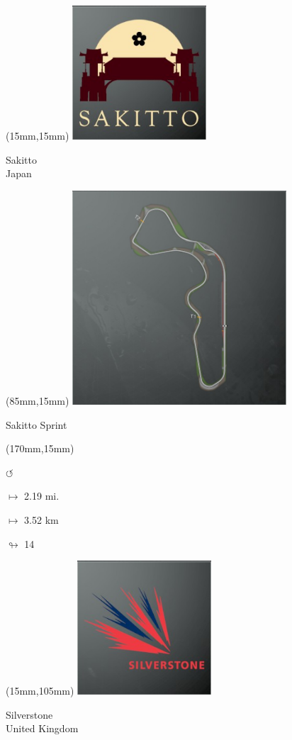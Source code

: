 \begin{textblock*}{60mm}(15mm,15mm)%
\includegraphics[width=50mm]{LG/2015-05-20_00093.png}
\par Sakitto\\ Japan
\end{textblock*}
\begin{textblock*}{80mm}(85mm,15mm)%
\includegraphics[width=80mm]{TR/2015-05-20_00053.png}
\centerline{Sakitto Sprint}
\end{textblock*}
\begin{textblock*}{30mm}(170mm,15mm)%
\par \Huge$\circlearrowleft$
\Large
\par$\mapsto$ 2.19 mi.
\par$\mapsto$ 3.52 km
\par$\looparrowright$ 14
\end{textblock*}
\begin{textblock*}{60mm}(15mm,105mm)%
\includegraphics[width=50mm]{LG/2015-05-20_00094.png}
\par Silverstone\\ United Kingdom
\end{textblock*}
